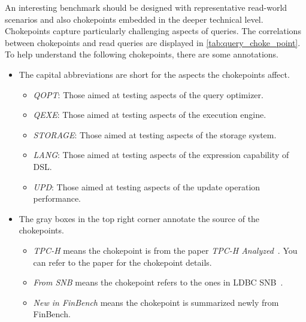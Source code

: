 An interesting benchmark should be designed with representative read-world scenarios
and also chokepoints embedded in the deeper technical level. Chokepoints capture
particularly challenging aspects of queries. The correlations between chokepoints
and read queries are displayed in \autoref{tab:query_choke_point}. To help understand
the following chokepoints, there are some annotations.
\begin{itemize}
    \item The capital abbreviations are short for the aspects the chokepoints affect. \begin{itemize}
              \item \emph{QOPT}: Those aimed at testing aspects of the query optimizer.
              \item \emph{QEXE}: Those aimed at testing aspects of the execution engine.
              \item \emph{STORAGE}: Those aimed at testing aspects of the storage system.
              \item \emph{LANG}: Those aimed at testing aspects of the expression capability of DSL.
              \item \emph{UPD}: Those aimed at testing aspects of the update operation performance.
          \end{itemize}
    \item The gray boxes in the top right corner annotate the source of the chokepoints. \begin{itemize}
              \item \emph{TPC-H} means the chokepoint is from the paper \emph{TPC-H Analyzed}~\cite{DBLP:conf/tpctc/BonczNE13}. You can refer to the paper for the chokepoint details.
              \item \emph{From SNB} means the chokepoint refers to the ones in LDBC SNB~\cite{ldbc_snb_docs}.
              \item \emph{New in FinBench} means the chokepoint is summarized newly from FinBench.
          \end{itemize}
\end{itemize}


{
\setlength{\tabcolsep}{.05em}

}


